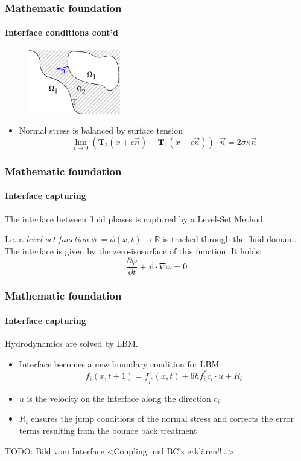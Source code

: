\documentclass[ucs]{beamer}
\begin{document}
\begin{frame}
\frametitle{Mathematic foundation}
\framesubtitle{Interface conditions cont'd}
\begin{figure}[h!]
\includegraphics[width=4cm]{skizze.png}
\end{figure}
\begin{itemize}
\item<1->Normal stress is balanced by surface tension
  $$\lim_{\epsilon \to 0}(\textbf{T}_2(x+\epsilon \vec n) - \textbf{T}_1(x-\epsilon \vec n)) \cdot \vec n= 2\sigma \kappa \vec n$$
\end{itemize}
\vspace{-.5cm}
\end{frame}

\begin{frame}
\frametitle{Mathematic foundation}
\framesubtitle{Interface capturing}
The interface between fluid phases is captured by a Level-Set Method.

I.e. a \textit{level set function} $\phi:= \phi(x,t) \rightarrow \mathbb{R}$ is tracked through the fluid domain. The interface is given by the zero-isosurface of this function.
It holds:
$$ \frac{\partial \varphi}{\partial t} + \vec v \cdot \nabla \varphi = 0$$
\end{frame}

\begin{frame}
\frametitle{Mathematic foundation}
\framesubtitle{Interface capturing}
Hydrodynamics are solved by LBM.
\begin{itemize}
\item<1-> Interface becomes a new boundary condition for LBM
$$f_i(x,t+1) = f_{i^*}^{+}(x,t) + 6hf_{i}^{*}c_i \cdot \tilde{u} + R_i$$
\item<2-> $\tilde{u}$ is the velocity on the interface along the direction $c_i$
\item<3-> $R_i$ ensures the jump conditions of the normal stress and corrects the error terms resulting from the bounce back treatment
\end{itemize}
TODO: Bild vom Interface
<Coupling und BC's erklären!!\ldots>
\end{frame}
\end{document}

